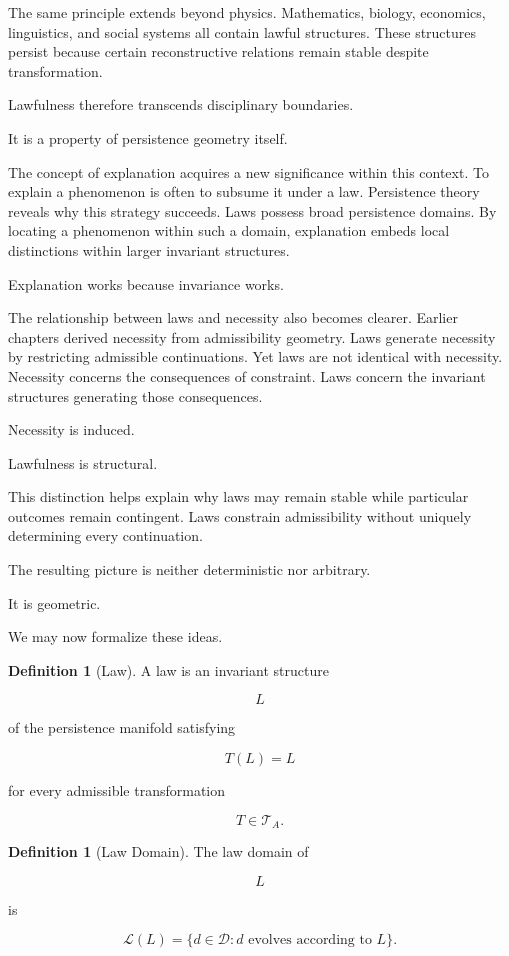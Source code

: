 \documentclass[12pt,oneside]{article}
\theoremstyle{definition}
\newtheorem{definition}[theorem]{Definition} \newtheorem{axiom}[theorem]{Axiom} \newtheorem{remark}[theorem]{Remark} \newtheorem{example}[theorem]{Example}
\begin{document}
The same principle extends beyond physics. Mathematics, biology, economics, linguistics, and social systems all contain lawful structures. These structures persist because certain reconstructive relations remain stable despite transformation.

Lawfulness therefore transcends disciplinary boundaries.

It is a property of persistence geometry itself.

The concept of explanation acquires a new significance within this context. To explain a phenomenon is often to subsume it under a law. Persistence theory reveals why this strategy succeeds. Laws possess broad persistence domains. By locating a phenomenon within such a domain, explanation embeds local distinctions within larger invariant structures.

Explanation works because invariance works.

The relationship between laws and necessity also becomes clearer. Earlier chapters derived necessity from admissibility geometry. Laws generate necessity by restricting admissible continuations. Yet laws are not identical with necessity. Necessity concerns the consequences of constraint. Laws concern the invariant structures generating those consequences.

Necessity is induced.

Lawfulness is structural.

This distinction helps explain why laws may remain stable while particular outcomes remain contingent. Laws constrain admissibility without uniquely determining every continuation.

The resulting picture is neither deterministic nor arbitrary.

It is geometric.

We may now formalize these ideas.

\begin{definition}[Law]

A law is an invariant structure

\[
L
\]

of the persistence manifold satisfying

\[
T(L)=L
\]

for every admissible transformation

\[
T \in \mathcal T_A.
\]

\end{definition}

\begin{definition}[Law Domain]

The law domain of

\[
L
\]

is

\[
\mathcal L(L)
=
\{
d \in \mathcal D :
d \text{ evolves according to } L
\}.
\]

\end{definition}
\end{document}
